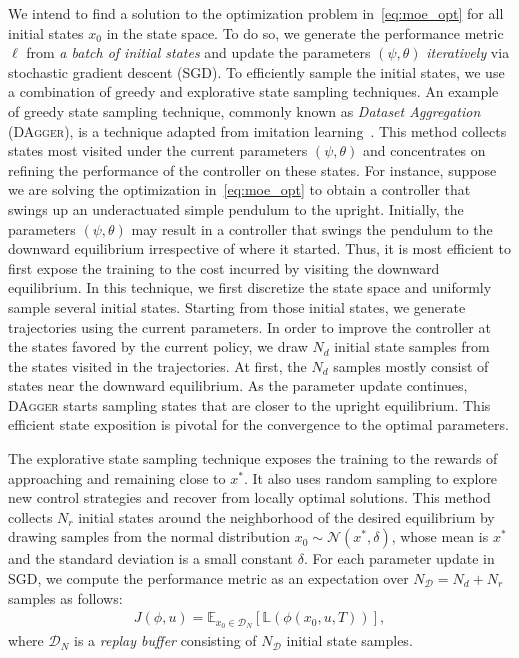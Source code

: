 We intend to find a solution to the optimization problem
in~\eqref{eq:moe_opt} for all initial states $x_0$ in the
state space.
%
To do so, we generate the performance metric $\ell$ from \textit{a batch of
initial states} and update the parameters $(\psi, \theta)$ \textit{iteratively}
via stochastic gradient descent (SGD). 
%
To efficiently sample the initial states, we use a combination of greedy and
explorative state sampling techniques.
%
An example of greedy state sampling technique, commonly known as \textit{Dataset
Aggregation} (\textsc{DAgger}), is a technique adapted from imitation
learning~\cite{ross2011no}.
%
This method collects states most visited under the current parameters $(\psi,
\theta)$ and concentrates on refining the performance of the controller on these
states.
%
For instance, suppose we are solving the optimization in~\eqref{eq:moe_opt} to
obtain a controller that swings up an underactuated simple pendulum to the
upright.
Initially, the parameters $(\psi, \theta)$ may result in a controller that
swings the pendulum to the downward equilibrium irrespective of where it
started.
%
Thus, it is most efficient to first expose the training to the cost incurred by
visiting the downward equilibrium.
%
In this technique, we first discretize the state space and uniformly sample
several initial states.
%
Starting from those initial states, we generate trajectories using the current
parameters.
%
In order to improve the controller at the states favored by the current policy,
we draw $N_d$ initial state samples from the states visited in the trajectories. 
%
At first, the $N_d$ samples mostly consist of states near the downward equilibrium.
%
As the parameter update continues, \textsc{DAgger} starts sampling states that
are closer to the upright equilibrium.
%
This efficient state exposition is pivotal for the convergence to the optimal
parameters.



The explorative state sampling technique exposes the training to the rewards of
approaching and remaining close to $x^*$.
%
It also uses random sampling to explore new control strategies and recover from locally optimal
solutions.  
%
This method collects $N_r$ initial states around the neighborhood of the desired
equilibrium by drawing samples from the normal distribution $x_0 \sim \mathcal{N}(x^*, \delta)$,
whose mean is $x^*$ and the standard deviation is a small constant $\delta$.
%
For each parameter update in SGD, we compute the performance metric as an expectation
over $N_{\mathcal{D}} = N_d+N_r$ samples as follows:
\begin{align}
    J(\phi, u) = \mathbb{E}_{x_0 \in \mathcal{D}_N}[ \mathbb{L}(\phi(x_0, u, T))],
    \label{eq:average_cost}
\end{align}
\noindent where $\mathcal{D}_N$ is a \textit{replay buffer} consisting of
$N_{\mathcal{D}}$ initial state samples.


